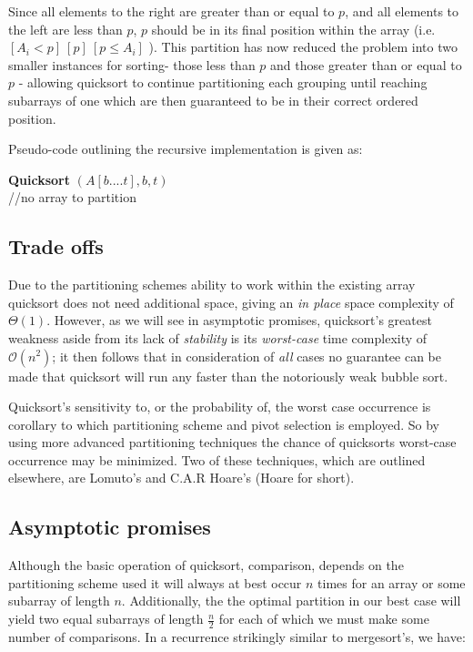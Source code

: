 \documentclass[11pt,letterpaper]{report}
\begin{document}
Since all elements to the right are greater than or equal to $p$, and all elements to the left are less than $p$, $p$ should be in its final position within the array (i.e. $[A_i < p]\ [p]\ [p \leq A_i ]$ ). This partition has now reduced the problem into two smaller instances for sorting- those less than $p$ and those greater than or equal to $p$ - allowing quicksort to continue partitioning each grouping until reaching subarrays of one which are then guaranteed to be in their correct ordered position.

Pseudo-code outlining the recursive implementation is given as:\\


\begin{algorithm}[H]
\textbf{Quicksort} $(A[b....t], b, t)$ \\
   {//no array to partition}
\end{algorithm}



\subsection*{Trade offs}
Due to the partitioning schemes ability to work within the existing array quicksort does not need additional space, giving an \emph{in place} space complexity of $\Theta(1)$. However, as we will see in asymptotic promises, quicksort's greatest weakness aside from its lack of \emph{stability} is its \emph{worst-case} time complexity of $\mathcal{O}(n^2)$; it then follows that in consideration of \emph{all} cases no guarantee can be made that quicksort will run any faster than the notoriously weak bubble sort.

Quicksort's sensitivity to, or the probability of, the worst case occurrence is corollary to which partitioning scheme and pivot selection is employed. So by using more advanced partitioning techniques the chance of quicksorts worst-case occurrence may be minimized. Two of these techniques, which are outlined elsewhere, are Lomuto's and C.A.R Hoare's (Hoare for short).

\subsection*{Asymptotic promises}
Although the basic operation of quicksort, comparison, depends on the partitioning scheme used it will always at best occur $n$ times for an array or some subarray of length $n$. Additionally, the the optimal partition in our best case will yield two equal subarrays of length $\frac{n}{2}$ for each of which we must make some number of comparisons. In a recurrence strikingly similar to mergesort's, we have:
\end{document}
